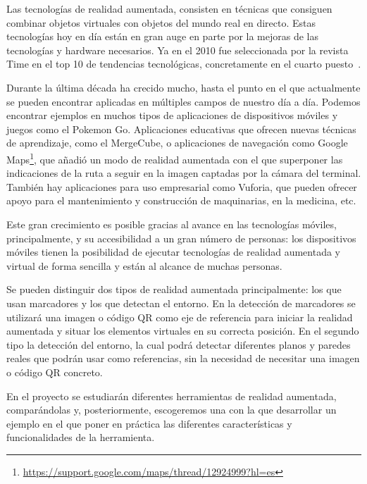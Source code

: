
Las tecnologías de realidad aumentada, consisten en técnicas que consiguen combinar objetos virtuales con objetos del mundo real en directo. 
Estas tecnologías hoy en día están en gran auge en parte por la mejoras de las tecnologías y hardware necesarios. Ya en el 2010 fue seleccionada por la revista Time en el top 10 de tendencias tecnológicas, concretamente en el cuarto puesto~\cite{fletcher_2010}. 

Durante la última década ha crecido mucho, hasta el punto en el que actualmente se pueden encontrar aplicadas en múltiples campos de nuestro día a día. Podemos encontrar ejemplos en muchos tipos de aplicaciones de dispositivos móviles y juegos como el Pokemon Go. Aplicaciones educativas que ofrecen nuevas técnicas de aprendizaje, como el MergeCube, o aplicaciones de navegación como Google Maps\footnote{\url{https://support.google.com/maps/thread/12924999?hl=es}}, que añadió un modo de realidad aumentada con el que superponer las indicaciones de la ruta a seguir en la imagen captadas por la cámara del terminal. También hay aplicaciones para uso empresarial como Vuforia, que pueden ofrecer apoyo para el mantenimiento y construcción de maquinarias, en la medicina, etc.

Este gran crecimiento es posible gracias al avance en las tecnologías móviles, principalmente, y su accesibilidad a un gran número de personas: los dispositivos móviles tienen la posibilidad de ejecutar tecnologías de realidad aumentada y virtual de forma sencilla y están al alcance de muchas personas.




Se pueden distinguir dos tipos de realidad aumentada principalmente: los que usan marcadores y los que detectan el entorno. En la detección de marcadores se utilizará una imagen o código QR como eje de referencia para iniciar la realidad aumentada y situar los elementos virtuales en su correcta posición. 
En el segundo tipo la detección del entorno, la cual podrá detectar diferentes planos y paredes reales que podrán usar como referencias, sin la necesidad de necesitar una imagen o código QR concreto.


En el proyecto se estudiarán diferentes herramientas de realidad aumentada, comparándolas y, posteriormente, escogeremos una con la que desarrollar un ejemplo en el que poner en práctica las diferentes características y funcionalidades de la herramienta.



